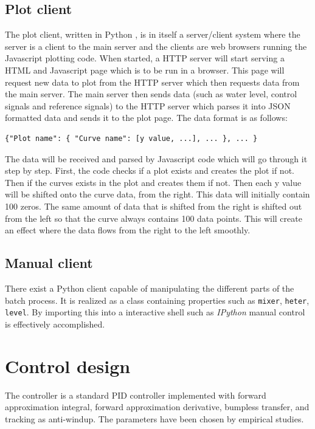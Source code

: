 \documentclass{article}
\begin{document}
\subsection{Plot client}
The plot client, written in Python \cite{python}, is in itself a server/client
system where the server is a client to the main server and the clients are web
browsers running the Javascript plotting code. When started, a HTTP server will
start serving a HTML and Javascript page which is to be run in a browser. This
page will request new data to plot from the HTTP server which then requests data
from the main server. The main server then sends data (such as water level,
control signals and reference signals) to the HTTP server which parses it into
JSON \cite{json} formatted data and sends it to the plot page. The data format is
as follows:
\begin{verbatim}
{"Plot name": { "Curve name": [y value, ...], ... }, ... }
\end{verbatim}
The data will be received and parsed by Javascript code which will go through it
step by step. First, the code checks if a plot exists and creates the plot if
not. Then if the curves exists in the plot and creates them if not. Then each y
value will be shifted onto the curve data, from the right. This data will
initially contain 100 zeros. The same amount of data that is shifted from the
right is shifted out from the left so that the curve always contains 100
data points. This will create an effect where the data flows from the right to
the left smoothly.


\subsection{Manual client}
There exist a Python client capable of manipulating the different parts
of the batch process. It is realized as a class containing properties
such as \verb+mixer+, \verb+heter+, \verb+level+. By importing this into
a interactive shell such as \emph{IPython} manual control is effectively
accomplished.


\section{Control design}
The controller is a standard PID controller implemented with forward
approximation integral, forward approximation derivative, bumpless transfer,
and tracking as anti-windup. The parameters have been chosen by empirical
studies.
\end{document}
